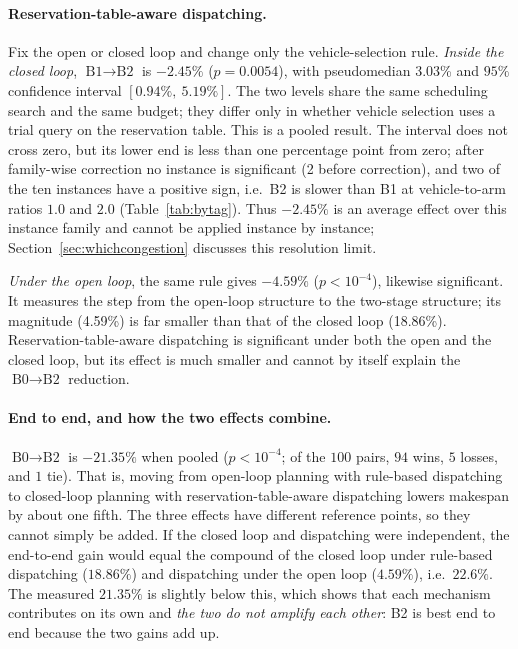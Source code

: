 \documentclass[manuscript,screen,review]{acmart}
\newcommand{\NPairs}{100}
\newcommand{\GainLoopRule}{18.86\%}      %
\newcommand{\GainProbeOpen}{4.59\%}      %
\newcommand{\PProbeOpen}{<10^{-4}}
\newcommand{\GainProbeLoop}{2.45\%}      %
\newcommand{\PProbeLoop}{=0.0054}
\newcommand{\GainEndToEnd}{21.35\%}      %
\newcommand{\PEndToEnd}{<10^{-4}}
\newcommand{\WinEndToEnd}{94}
\newcommand{\LoseEndToEnd}{5}
\newcommand{\HLProbeLoop}{3.03\%}
\newcommand{\CIProbeLoop}{$[0.94\%,\ 5.19\%]$}
\newcommand{\GainIndepProduct}{22.6\%}
\newcommand{\CellsSigProbe}{2}
\begin{document}
\paragraph{Reservation-table-aware dispatching.}
Fix the open or closed loop and change only the vehicle-selection rule. \emph{Inside the closed loop},
$\text{B1}\to\text{B2}$ is $-\GainProbeLoop$ ($p\PProbeLoop$), with pseudomedian \HLProbeLoop{} and
$95\%$ confidence interval \CIProbeLoop{}.
The two levels share the same scheduling search and the same budget; they differ only in whether vehicle selection uses a trial query on the reservation table.
This is a pooled result. The interval does not cross zero, but its lower end is less than one percentage point from zero; after family-wise correction no instance is significant (\CellsSigProbe{} before correction), and two of the ten instances have a positive sign, i.e.\ B2 is slower than B1 at vehicle-to-arm ratios $1.0$ and $2.0$ (Table~\ref{tab:bytag}).
Thus $-\GainProbeLoop$ is an average effect over this instance family and cannot be applied instance by instance;
Section~\ref{sec:whichcongestion} discusses this resolution limit.

\emph{Under the open loop}, the same rule gives $-\GainProbeOpen$ ($p\PProbeOpen$), likewise significant.
It measures the step from the open-loop structure to the two-stage structure;
its magnitude (\GainProbeOpen{}) is far smaller than that of the closed loop (\GainLoopRule{}).
Reservation-table-aware dispatching is significant under both the open and the closed loop, but its effect is much smaller and cannot by itself explain the $\text{B0}\to\text{B2}$ reduction.

\paragraph{End to end, and how the two effects combine.}
\label{sec:complement}
$\text{B0}\to\text{B2}$ is $-\GainEndToEnd$ when pooled
($p\PEndToEnd$; of the $\NPairs$ pairs, $\WinEndToEnd$ wins, $\LoseEndToEnd$ losses, and $1$ tie).
That is, moving from open-loop planning with rule-based dispatching to closed-loop planning with reservation-table-aware dispatching lowers makespan by about one fifth. The three effects have different reference points, so they cannot simply be added.
If the closed loop and dispatching were independent, the end-to-end gain would equal the compound of the closed loop under rule-based dispatching ($\GainLoopRule$) and dispatching under the open loop ($\GainProbeOpen$), i.e.\ $\GainIndepProduct$. The measured $\GainEndToEnd$ is slightly below this, which shows that each mechanism contributes on its own and \emph{the two do not amplify each other}: B2 is best end to end because the two gains add up.
\end{document}

